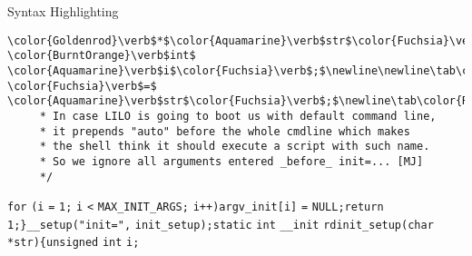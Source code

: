 \begin{frame}{Syntax Highlighting}
\begin{verbatim}
\color{Goldenrod}\verb$*$\color{Aquamarine}\verb$str$\color{Fuchsia}\verb$)$\newline\color{Fuchsia}\verb${$\newline\tab\color{BurntOrange}\verb$unsigned$ \color{BurntOrange}\verb$int$ \color{Aquamarine}\verb$i$\color{Fuchsia}\verb$;$\newline\newline\tab\color{Aquamarine}\verb$execute_command$ \color{Fuchsia}\verb$=$ \color{Aquamarine}\verb$str$\color{Fuchsia}\verb$;$\newline\tab\color{Rhodamine}\begin{verbatim}/*
	 * In case LILO is going to boot us with default command line,
	 * it prepends "auto" before the whole cmdline which makes
	 * the shell think it should execute a script with such name.
	 * So we ignore all arguments entered _before_ init=... [MJ]
	 */\end{verbatim}\leavevmode\newline\tab\color{BurntOrange}\verb$for$ \color{Fuchsia}\verb$($\color{Aquamarine}\verb$i$ \color{Fuchsia}\verb$=$ \color{ForestGreen}\verb$1$\color{Fuchsia}\verb$;$ \color{Aquamarine}\verb$i$ \color{Goldenrod}\verb$<$ \color{Aquamarine}\verb$MAX_INIT_ARGS$\color{Fuchsia}\verb$;$ \color{Aquamarine}\verb$i$\color{Goldenrod}\verb$++$\color{Fuchsia}\verb$)$\newline\tab\tab\color{Aquamarine}\verb$argv_init$\color{Fuchsia}\verb$[$\color{Aquamarine}\verb$i$\color{Fuchsia}\verb$]$ \color{Fuchsia}\verb$=$ \color{Aquamarine}\verb$NULL$\color{Fuchsia}\verb$;$\newline\tab\color{BurntOrange}\verb$return$ \color{ForestGreen}\verb$1$\color{Fuchsia}\verb$;$\newline\color{Fuchsia}\verb$}$\newline\color{Aquamarine}\verb$__setup$\color{Fuchsia}\verb$($\color{Emerald}\verb$"init="$\color{Fuchsia}\verb$,$ \color{Aquamarine}\verb$init_setup$\color{Fuchsia}\verb$)$\color{Fuchsia}\verb$;$\newline\newline\color{BurntOrange}\verb$static$ \color{BurntOrange}\verb$int$ \color{Aquamarine}\verb$__init$ \color{Aquamarine}\verb$rdinit_setup$\color{Fuchsia}\verb$($\color{BurntOrange}\verb$char$ \color{Goldenrod}\verb$*$\color{Aquamarine}\verb$str$\color{Fuchsia}\verb$)$\newline\color{Fuchsia}\verb${$\newline\tab\color{BurntOrange}\verb$unsigned$ \color{BurntOrange}\verb$int$ \color{Aquamarine}\verb$i$\color{Fuchsia}\verb$;$\newline
\end{frame}
